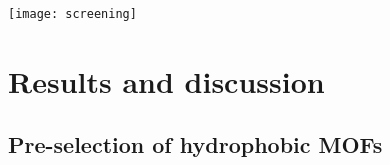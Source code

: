 \begin{widefigure}[b]
    \centering
    \texttt{[image: screening]}
    \caption{%
        (a) Predicted D4 uptake performance at \SI{298}{\kelvin} for the
        hydrophobic MOF database plotted as a function of computed \(\Delta
        H_{st,H_{2}O}^{0}\), and colour coded by void fraction, \(\phi\). Top
        performing 10 candidates are represented by different symbols in the
        legend. (b) Relation between gravimetric (\si{\gram\per\gram}) and
        volumetric (\si{\gram\per\centi\metre\cubed}) D4 uptake for all MOFs at
        \SI{298}{\kelvin}. Marker size represents PV while colour denotes
        \(\phi\). Dashed line represents the gravimetric and volumetric uptake
        of benchmark MIL-101(Cr)\citep{gargiuloChromiumbasedMIL101Metal2019}.
        (c) Illustration of the structure of our promising material identified for D4 uptake,
        PCN-777. Zr, N, O, C, and H atoms are depicted in light blue, dark blue,
        red, dark grey, and light grey, respectively.
    }\label{fig:d4-screening}
\end{widefigure}

\section{Results and discussion}\label{results-and-discussion}

\subsection{Pre-selection of hydrophobic MOFs}\label{pre-screening}

